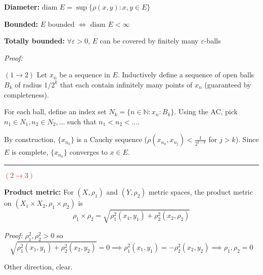 \documentclass[12pt]{article}
\newcommand{\N}{\mathbb{N}}
\newcommand{\ep}{\varepsilon}
\renewcommand{\div}{\vspace*{10pt}\hrule\vspace*{10pt}}
\newcommand{\diam}{\text{diam }}
\newenvironment*{tbox}[2][gray]{
    \begin{tcolorbox}[
        parbox=false,
        colback=#1!5!white,
        colframe=#1!75!black,
        breakable,
        title={#2}
    ]}
    {\end{tcolorbox}}
\begin{document}
    \textbf{Diameter:} $\diam E = \sup\{\rho(x, y): x, y \in E\}$

    \textbf{Bounded:} $E$ bounded $\iff$ $\diam E < \infty$

    \textbf{Totally bounded:} $\forall \ep >0$, $E$ can be covered by finitely many $\ep$-balls

    \begin{tbox}{\textbf{Characterization of compactness:} The following are equivalent definitions of \emph{compactness}:
        \begin{enumerate}
            \item $E$ is complete and totally bounded 
            \item Every sequence in $E$ has a convergent subsequence with its limit in $E$
            \item Every open cover has a finite subcover
        \end{enumerate} }
        \emph{Proof:}

        $(1 \to 2)$ Let $x_n$ be a sequence in $E$. Inductively define a sequence of open balls $B_k$ of radius $1/2^k$ that each contain infinitely many points of $x_n$  (guaranteed by completeness). 
        
        For each ball, define an index set $N_k = \{n \in \N: x_n: B_k\}$. Using the AC, pick $n_1 \in N_1, n_2 \in N_2, \dots$ such that $n_1 < n_2 < \dots$. 

        By construction, $\{x_{n_k}\}$ is a Cauchy sequence ($\rho(x_{n_k}, x_{n_j}) < \frac{1}{2^{1-k}}$ for $j > k$). Since $E$ is complete, $\{x_{n_k}\}$ converges to $x \in E$.

        \div 

       \textcolor{red}{ $(2 \to 3)$}

        
    \end{tbox}

    \textbf{Product metric:} For $(X, \rho_1)$ and $(Y, \rho_2)$ metric spaces, the product metric on $(X_1 \times X_2, \rho_1 \times \rho_2)$ is 
    \[\rho_1 \times \rho_2 = \sqrt{\rho_1^2(x_1, y_1) + \rho_2^2(x_2, \rho_2)}\]

    \begin{tbox}{\textbf{Property:} $\rho_1 \times \rho_2 \to 0 \iff \rho_1 \to 0 \land \rho_2 \to 0$ }
        \emph{Proof:} $\rho_1^2, \rho_2^2 > 0$ so 
        \[\sqrt{\rho_1^2(x_1, y_1) + \rho_2^2(x_2, y_2)} = 0 \implies \rho_1^2(x_1, y_1) = -\rho_2^2(x_2, y_2) \implies \rho_1, \rho_2 = 0\]

        Other direction, clear. 
    \end{tbox}
\end{document}
